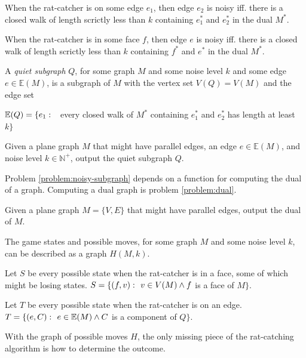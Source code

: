 \documentclass{article}
\begin{document}
		\begin{definition}\label{def:edge-noisy}
			When the rat-catcher is on some edge $e_1$, then edge $e_2$ is noisy iff. there is a closed walk of length scrictly less than $k$ containing $e_1^*$ and $e_2^*$ in the dual $M^*$.
		\end{definition}

		\begin{definition}\label{def:face-quiet}
			When the rat-catcher is in some face $f$, then edge $e$ is noisy iff. there is a closed walk of length scrictly less than $k$ containing $f^*$ and $e^*$ in the dual $M^*$.
		\end{definition}

		A \textit{quiet subgraph} $Q$, for some graph $M$ and some noise level $k$ and some edge $e \in \mathbb{E}(M)$, is a subgraph of $M$ with the vertex set $V(Q) = V(M)$ and the edge set

		$\mathbb{E}(Q) = \{e_1 \,\colon\  $ every closed walk of $M^*$ containing $e_1^*$ and $e_2^*$ has length at least $k\}$

		\begin{problem}\label{problem:noisy-subgraph}
			Given a plane graph $M$ that might have parallel edges, an edge $e \in \mathbb{E}(M)$, and noise level $k \in \mathbb{N}^+$, output the quiet subgraph $Q$.
		\end{problem}

		Problem \ref{problem:noisy-subgraph} depends on a function for computing the dual of a graph. Computing a dual graph is problem \ref{problem:dual}.

		\begin{problem}\label{problem:dual}
			Given a plane graph $M = \{V, E\}$ that might have parallel edges, output the dual of $M$.
		\end{problem}

		The game states and possible moves, for some graph $M$ and some noise level $k$, can be described as a graph $H(M, k)$.

		Let $S$ be every possible state when the rat-catcher is in a face, some of which might be losing states. $S = \{ (f, v) \,\colon\  v \in V(M) \land f$ is a face of $ M \}$.

		Let $T$ be every possible state when the rat-catcher is on an edge. $T = \{ (e, C) \,\colon\  e \in \mathbb{E}(M) \land C$ is a component of $Q \}$.
		
		With the graph of possible moves $H$, the only missing piece of the rat-catching algorithm is how to determine the outcome.
\end{document}
